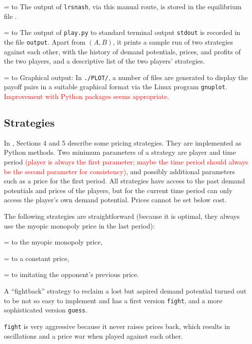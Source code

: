 \documentclass[a4paper,12pt]{article}  %
\def\R{\textcolor{red}}
\def\rmitem#1{\par\hangafter=1\hangindent=\einr
  \noindent\hbox to\einr{\ignorespaces#1\hfill}\ignorespaces}
\newcommand\bullitem{\rmitem{\raise.17ex\hbox{\kern7pt\scriptsize$\bullet$}}}
\theoremstyle{definition}
\begin{document}
\bullitem
The output of {\tt lrsnash}, via this manual route, is
stored in the equilibrium file \equifile.


\bullitem
The output of {\tt play.py} to standard terminal output {\tt stdout} is
recorded in the file {\tt output}.
Apart from $(A,B)$, it prints a sample run of two
strategies against each other, with the history of demand
potentials, prices, and profits of the two players,
and a descriptive list of the two players' strategies.

\bullitem
Graphical output:
In {\tt ./PLOT/}, a number of files are generated to 
display the payoff pairs in a suitable graphical format via
the Linux program {\tt gnuplot}.
\R{Improvement with Python packages seems appropriate.}

\subsection{Strategies}

In \projfile, Sections 4 and 5 describe some pricing
strategies.
They are implemented as Python methods.
Two minimum parameters of a strategy are player and time
period
\R{(player is always the first parameter; maybe the time
period should always be the second parameter for
consistency)},
and possibly additional parameters such as a price for the
first period.
All strategies have access to the past demand potentials and prices
of the players, but for the current time period can only
access the player's own demand potential.
Prices cannot be set below cost.

The following strategies are straightforward 
(because it is optimal, they always use the myopic monopoly
price in the last period):
\bullitem
the myopic monopoly price,
\bullitem
a constant price,
\bullitem
imitating the opponent's previous price.

A ``fightback'' strategy to reclaim a lost but aspired
demand potential turned out to be not so easy to implement
and has a first version {\tt fight}, and a more sophisticated
version {\tt guess}.

{\tt fight} is very aggressive because it never raises
prices back, which results in oscillations and a price war
when played against each other.
\end{document}
